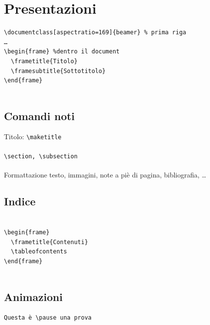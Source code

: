 \section{Presentazioni}
  \texttt{\textbackslash{}documentclass[aspectratio=169]\{beamer\} \% prima riga}
  \texttt{\\\dots\\
  \textbackslash{}begin\{frame\} \%dentro il document
\\
  ~~\textbackslash{}frametitle\{Titolo\}~~~~~~~~~~~~~
\\
  ~~\textbackslash{}framesubtitle\{Sottotitolo\}~~~~~
\\
  \textbackslash{}end\{frame\}
~~~~~~~~~~~~~~~~~~~~~~~\\~}
  \subsection{Comandi noti}
  Titolo: \texttt{\textbackslash{}maketitle}\\~\\
  \texttt{\textbackslash{}section, \textbackslash{}subsection}\\~\\
  Formattazione testo, immagini, note a piè di pagina, bibliografia, \dots

  \subsection{Indice}
  \texttt{~\\
  \textbackslash{}begin\{frame\}~~~~~~~~~~~\\
  ~~\textbackslash{}frametitle\{Contenuti\}\\
  ~~\textbackslash{}tableofcontents~~~~~~~~\\
  \textbackslash{}end\{frame\}~~~~~~~~~~~~~\\~
}
\subsection{Animazioni}
  \texttt{Questa è \textbackslash{}pause una prova}
